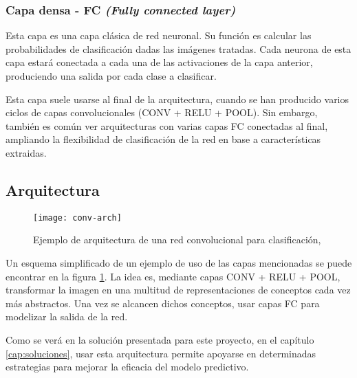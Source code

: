 \subsubsection{Capa densa - FC \textit{(Fully connected layer)}}

Esta capa es una capa clásica de red neuronal. Su función es calcular las probabilidades de clasificación dadas las imágenes tratadas. Cada neurona de esta capa estará conectada a cada una de las activaciones de la capa anterior, produciendo una salida por cada clase a clasificar.

Esta capa suele usarse al final de la arquitectura, cuando se han producido varios ciclos de capas convolucionales (CONV + RELU + POOL). Sin embargo, también es común ver arquitecturas con varias capas FC conectadas al final, ampliando la flexibilidad de clasificación de la red en base a características extraidas.

\subsection{Arquitectura}
\label{sec:conv-net-arch}

\begin{figure}
    \centering
    \caption{Ejemplo de arquitectura de una red convolucional para clasificación, \parencite{clarifai}}
\label{conv-arch}
  \texttt{[image: conv-arch]}
\end{figure}

Un esquema simplificado de un ejemplo de uso de las capas mencionadas se puede encontrar en la figura \ref{conv-arch}. La idea es, mediante capas CONV + RELU + POOL, transformar la imagen en una multitud de representaciones de conceptos cada vez más abstractos. Una vez se alcancen dichos conceptos, usar capas FC para modelizar la salida de la red.

Como se verá en la solución presentada para este proyecto, en el capítulo \ref{cap:soluciones}, usar esta arquitectura permite apoyarse en determinadas estrategias para mejorar la eficacia del modelo predictivo.
